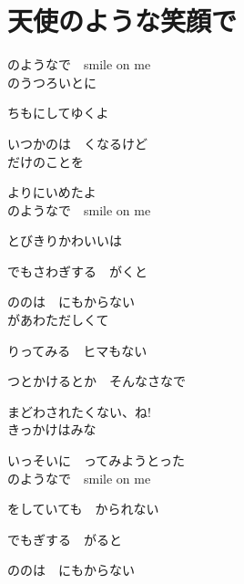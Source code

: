 \section{ 天使のような笑顔で}
\large{

のようなで　smile on me
\\

のうつろいとに

ちもにしてゆくよ

いつかのは　くなるけど
\\

だけのことを

よりにいめたよ
\\

のようなで　smile on me

とびきりかわいいは

でもさわぎする　がくと

ののは　にもからない
\\

があわただしくて

りってみる　ヒマもない

つとかけるとか　そんなさなで

まどわされたくない、ね!
\\

きっかけはみな

いっそいに　ってみようとった
\\

のようなで　smile on me

をしていても　かられない

でもぎする　がると

ののは　にもからない
\\

}
